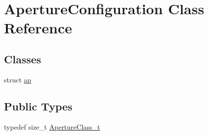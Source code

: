 \hypertarget{classApertureConfiguration}{}\section{Aperture\+Configuration Class Reference}
\label{classApertureConfiguration}
\subsection*{Classes}
\begin{DoxyCompactItemize}
\item 
struct \hyperlink{structApertureConfiguration_1_1ap}{ap}
\end{DoxyCompactItemize}
\subsection*{Public Types}
\begin{DoxyCompactItemize}
\item 
typedef size\+\_\+t \hyperlink{classApertureConfiguration_a84c9eaffaf4394f1538d2ec57a85c706}{Aperture\+Class\+\_\+t}
\end{DoxyCompactItemize}
